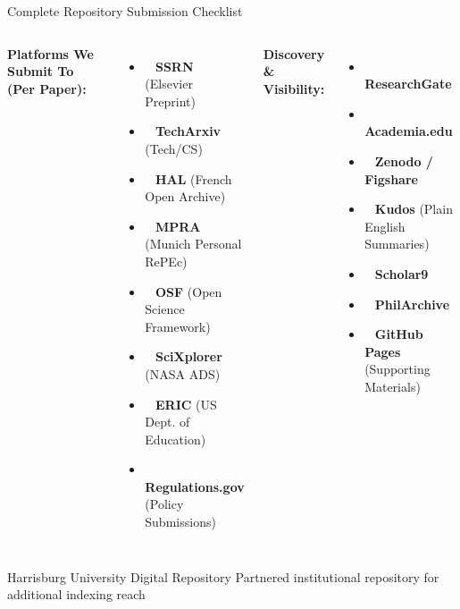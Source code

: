 \documentclass[10pt, aspectratio=169]{beamer}
\begin{document}
	
	\begin{frame}{Complete Repository Submission Checklist}
		\begin{columns}[T]
			\textbf{Platforms We Submit To (Per Paper):}
			\begin{itemize}
				\item \faCheckSquare~ \textbf{SSRN} (Elsevier Preprint)
				\item \faCheckSquare~ \textbf{TechArxiv} (Tech/CS)
				\item \faCheckSquare~ \textbf{HAL} (French Open Archive)
				\item \faCheckSquare~ \textbf{MPRA} (Munich Personal RePEc)
				\item \faCheckSquare~ \textbf{OSF} (Open Science Framework)
				\item \faCheckSquare~ \textbf{SciXplorer} (NASA ADS)
				\item \faCheckSquare~ \textbf{ERIC} (US Dept. of Education)
				\item \faCheckSquare~ \textbf{Regulations.gov} (Policy Submissions)
			\end{itemize}
			
			\textbf{Discovery \& Visibility:}
			\begin{itemize}
				\item \faCheckSquare~ \textbf{ResearchGate}
				\item \faCheckSquare~ \textbf{Academia.edu}
				\item \faCheckSquare~ \textbf{Zenodo / Figshare}
				\item \faCheckSquare~ \textbf{Kudos} (Plain English Summaries)
				\item \faCheckSquare~ \textbf{Scholar9}
				\item \faCheckSquare~ \textbf{PhilArchive}
				\item \faCheckSquare~ \textbf{GitHub Pages} (Supporting Materials)
			\end{itemize}
		\end{columns}
		
		\vspace{0.3cm}
		\begin{block}{Harrisburg University Digital Repository}
			\tiny Partnered institutional repository for additional indexing reach
		\end{block}
	\end{frame}
	
	
\end{document}

